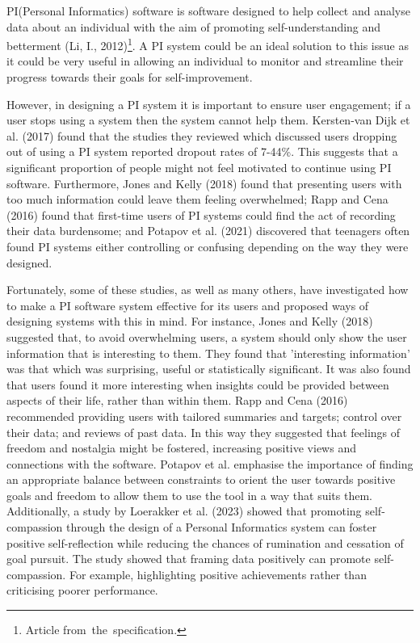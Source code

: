 \documentclass[11pt]{article}
\begin{document}
PI(Personal Informatics) software is software designed to help collect and
analyse data about an individual with the aim of promoting self-understanding
and betterment (Li, I., 2012)\footnote{Article from the specification.}.
A PI system could be an ideal solution to this issue as it
could be very useful in allowing an individual to monitor and streamline their
progress towards their goals for self-improvement.\par

However, in designing a PI system it is important to ensure user engagement; if
a user stops using a system then the system cannot help them. Kersten-van Dijk
et al. (2017) found that the studies they reviewed which discussed users
dropping out of using a PI system reported dropout rates of 7-44\%. This
suggests that a significant proportion of people might not feel motivated to
continue using PI software. Furthermore, Jones and Kelly (2018) found that
presenting users with too much information could leave them feeling
overwhelmed; Rapp and Cena (2016) found that first-time users of PI systems
could find the act of recording their data burdensome; and Potapov et al.
(2021) discovered that teenagers often found PI systems either controlling or
confusing depending on the way they were designed.\par

Fortunately, some of these studies, as well as many others, have investigated
how to make a PI software system effective for its users and proposed ways of
designing systems with this in mind. For instance, Jones and Kelly (2018)
suggested that, to avoid overwhelming users, a system should only show the user
information that is interesting to them. They found that 'interesting
information' was that which was surprising, useful or statistically
significant. It was also found that users found it more interesting when
insights could be provided between aspects of their life, rather than within
them. Rapp and Cena (2016) recommended providing users with tailored summaries
and targets; control over their data; and reviews of past data. In this way
they suggested that feelings of freedom and nostalgia might be fostered,
increasing positive views and connections with the software. Potapov et al.
emphasise the importance of finding an appropriate balance between constraints
to orient the user towards positive goals and freedom to allow them to use the
tool in a way that suits them. Additionally, a study by Loerakker et al. (2023)
showed that promoting self-compassion through the design of a Personal
Informatics system can foster positive self-reflection while reducing the
chances of rumination and cessation of goal pursuit. The study showed that
framing data positively can promote self-compassion. For example, highlighting
positive achievements rather than criticising poorer performance.\par
\end{document}
